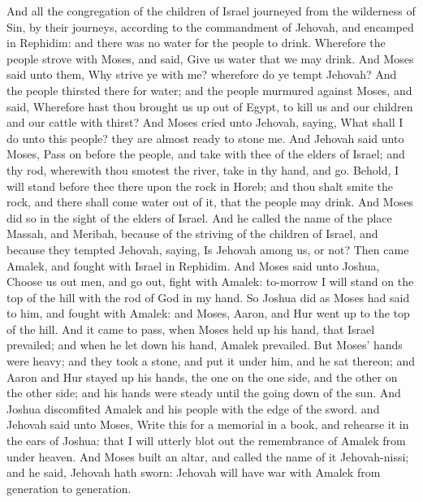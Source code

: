 And all the congregation of the children of Israel journeyed from the wilderness of Sin, by their journeys, according to the commandment of Jehovah, and encamped in Rephidim: and there was no water for the people to drink. Wherefore the people strove with Moses, and said, Give us water that we may drink. And Moses said unto them, Why strive ye with me? wherefore do ye tempt Jehovah? And the people thirsted there for water; and the people murmured against Moses, and said, Wherefore hast thou brought us up out of Egypt, to kill us and our children and our cattle with thirst? And Moses cried unto Jehovah, saying, What shall I do unto this people? they are almost ready to stone me. And Jehovah said unto Moses, Pass on before the people, and take with thee of the elders of Israel; and thy rod, wherewith thou smotest the river, take in thy hand, and go. Behold, I will stand before thee there upon the rock in Horeb; and thou shalt smite the rock, and there shall come water out of it, that the people may drink. And Moses did so in the sight of the elders of Israel. And he called the name of the place Massah, and Meribah, because of the striving of the children of Israel, and because they tempted Jehovah, saying, Is Jehovah among us, or not?  Then came Amalek, and fought with Israel in Rephidim. And Moses said unto Joshua, Choose us out men, and go out, fight with Amalek: to-morrow I will stand on the top of the hill with the rod of God in my hand. So Joshua did as Moses had said to him, and fought with Amalek: and Moses, Aaron, and Hur went up to the top of the hill. And it came to pass, when Moses held up his hand, that Israel prevailed; and when he let down his hand, Amalek prevailed. But Moses’ hands were heavy; and they took a stone, and put it under him, and he sat thereon; and Aaron and Hur stayed up his hands, the one on the one side, and the other on the other side; and his hands were steady until the going down of the sun. And Joshua discomfited Amalek and his people with the edge of the sword. and Jehovah said unto Moses, Write this for a memorial in a book, and rehearse it in the ears of Joshua: that I will utterly blot out the remembrance of Amalek from under heaven. And Moses built an altar, and called the name of it Jehovah-nissi; and he said, Jehovah hath sworn: Jehovah will have war with Amalek from generation to generation. 

